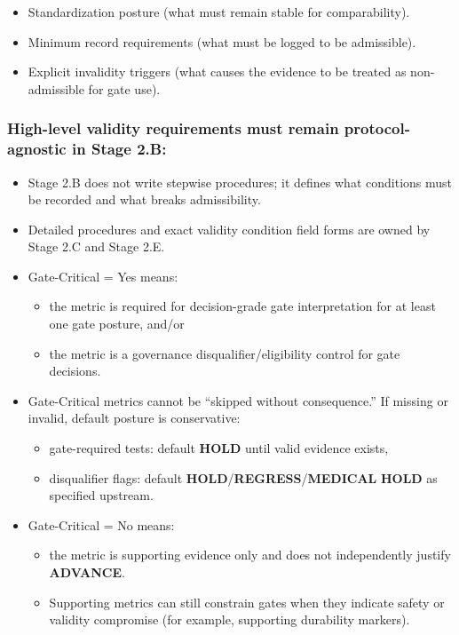 \documentclass[10pt]{article}
\begin{document}
\begin{itemize}
\item Standardization posture (what must remain stable for comparability).
\item Minimum record requirements (what must be logged to be admissible).
\item Explicit invalidity triggers (what causes the evidence to be treated as non-admissible for gate use).
\end{itemize}

\subsubsection*{High-level validity requirements must remain protocol-agnostic in Stage 2.B:}

\begin{itemize}
\item Stage 2.B does not write stepwise procedures; it defines what conditions must be recorded and what breaks admissibility.
\item Detailed procedures and exact validity condition field forms are owned by Stage 2.C and Stage 2.E.
\end{itemize}

\begin{itemize}
\item Gate-Critical = Yes means:
  \begin{itemize}
  \item the metric is required for decision-grade gate interpretation for at least one gate posture, and/or
  \item the metric is a governance disqualifier/eligibility control for gate decisions.
  \end{itemize}
\item Gate-Critical metrics cannot be “skipped without consequence.” If missing or invalid, default posture is conservative:
  \begin{itemize}
  \item gate-required tests: default \textbf{HOLD} until valid evidence exists,
  \item disqualifier flags: default \textbf{HOLD}/\textbf{REGRESS}/\textbf{MEDICAL} \textbf{HOLD} as specified upstream.
  \end{itemize}
\item Gate-Critical = No means:
  \begin{itemize}
  \item the metric is supporting evidence only and does not independently justify \textbf{ADVANCE}.
  \item Supporting metrics can still constrain gates when they indicate safety or validity compromise (for example, supporting durability markers).
  \end{itemize}
\end{itemize}
\end{document}
